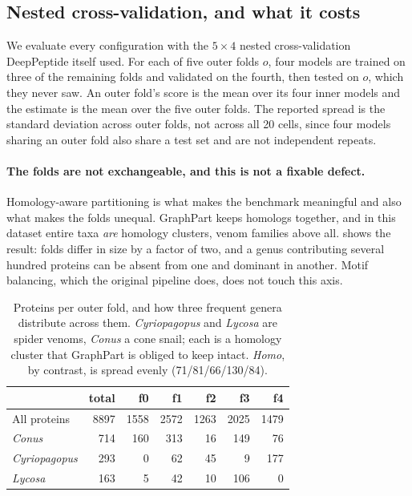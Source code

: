 \documentclass{article}
\begin{document}
\subsection{Nested cross-validation, and what it costs}
\label{sec:eval-protocol}

We evaluate every configuration with the $5\times4$ nested cross-validation DeepPeptide itself used. For each of five outer folds $o$, four models are trained on three of the remaining folds and validated on the fourth, then tested on $o$, which they never saw. An outer fold's score is the mean over its four inner models and the estimate is the mean over the five outer folds. The reported spread is the standard deviation across outer folds, not across all 20 cells, since four models sharing an outer fold also share a test set and are not independent repeats.

\paragraph{The folds are not exchangeable, and this is not a fixable defect.} Homology-aware partitioning is what makes the benchmark meaningful and also what makes the folds unequal. GraphPart keeps homologs together, and in this dataset entire taxa \emph{are} homology clusters, venom families above all.  shows the result: folds differ in size by a factor of two, and a genus contributing several hundred proteins can be absent from one and dominant in another. Motif balancing, which the original pipeline does, does not touch this axis.

\begin{table}[h]
\centering
\caption{Proteins per outer fold, and how three frequent genera distribute across them. \emph{Cyriopagopus} and \emph{Lycosa} are spider venoms, \emph{Conus} a cone snail; each is a homology cluster that GraphPart is obliged to keep intact. \textit{Homo}, by contrast, is spread evenly (71/81/66/130/84).}
\label{tab:genus}
\small
\begin{tabular}{lrrrrrr}
\toprule
 & \textbf{total} & \textbf{f0} & \textbf{f1} & \textbf{f2} & \textbf{f3} & \textbf{f4} \\
\midrule
All proteins & 8897 & 1558 & 2572 & 1263 & 2025 & 1479 \\
\midrule
\textit{Conus} & 714 & 160 & 313 & 16 & 149 & 76 \\
\textit{Cyriopagopus} & 293 & 0 & 62 & 45 & 9 & 177 \\
\textit{Lycosa} & 163 & 5 & 42 & 10 & 106 & 0 \\
\bottomrule
\end{tabular}
\end{table}
\end{document}
